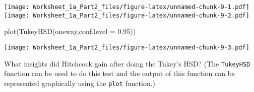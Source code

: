 \documentclass[
]{article}
\newenvironment{Shaded}{\begin{snugshade}}{\end{snugshade}}
\newcommand{\AttributeTok}[1]{\textcolor[rgb]{0.77,0.63,0.00}{#1}}
\newcommand{\FloatTok}[1]{\textcolor[rgb]{0.00,0.00,0.81}{#1}}
\newcommand{\FunctionTok}[1]{\textcolor[rgb]{0.00,0.00,0.00}{#1}}
\newcommand{\NormalTok}[1]{#1}
\begin{document}
\texttt{[image: Worksheet\_1a\_Part2\_files/figure-latex/unnamed-chunk-9-1.pdf]}
\texttt{[image: Worksheet\_1a\_Part2\_files/figure-latex/unnamed-chunk-9-2.pdf]}

\begin{Shaded}
\begin{Highlighting}[]
\FunctionTok{plot}\NormalTok{(}\FunctionTok{TukeyHSD}\NormalTok{(oneway,}\AttributeTok{conf.level =} \FloatTok{0.95}\NormalTok{))}
\end{Highlighting}
\end{Shaded}

\texttt{[image: Worksheet\_1a\_Part2\_files/figure-latex/unnamed-chunk-9-3.pdf]}

What insights did Hitchcock gain after doing the Tukey's HSD? (The
\texttt{TukeyHSD} function can be used to do this test and the output of
this function can be represented graphically using the \texttt{plot}
function.)
\end{document}
